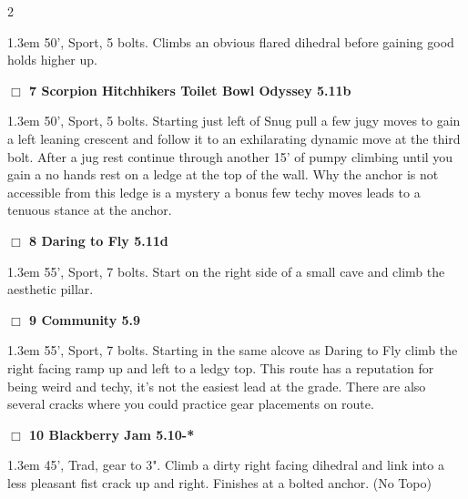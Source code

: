 \begin{multicols}{2}
\begin{adjustwidth}{1.3em}{}
50', Sport, 5 bolts. Climbs an obvious flared dihedral before gaining good holds higher up.
\end{adjustwidth}
\needspace{2em}
\label{rt:Scorpion Hitchhikers Toilet Bowl Odyssey}
\colorbox{RoyalBlue!20}{
\parbox{0.95\linewidth}{
\hspace{-1ex}\textbf{$\Box$
7 Scorpion Hitchhikers Toilet Bowl Odyssey 5.11b  
}}}
\begin{adjustwidth}{1.3em}{}			
50', Sport, 5 bolts. Starting just left of Snug pull a few jugy moves to gain a left leaning crescent and follow it to an exhilarating dynamic move at the third bolt. After a jug rest continue through another 15' of pumpy climbing until you gain a no hands rest on a ledge at the top of the wall. Why the anchor is not accessible from this ledge is a mystery a bonus few techy moves leads to a tenuous stance at the anchor.
\end{adjustwidth}
\needspace{2em}
\label{rt:Daring to Fly}
\colorbox{RoyalBlue!20}{
\parbox{0.95\linewidth}{
\hspace{-1ex}\textbf{$\Box$
8 Daring to Fly 5.11d  
}}}
\begin{adjustwidth}{1.3em}{}			
55', Sport, 7 bolts. Start on the right side of a small cave and climb the aesthetic pillar.
\end{adjustwidth}
\needspace{2em}
\label{rt:Community}
\colorbox{green!20}{
\parbox{0.95\linewidth}{
\hspace{-1ex}\textbf{$\Box$
9 Community 5.9  
}}}
\begin{adjustwidth}{1.3em}{}			
55', Sport, 7 bolts. Starting in the same alcove as Daring to Fly climb the right facing ramp up and left to a ledgy top. This route has a reputation for being weird and techy, it's not the easiest lead at the grade. There are also several cracks where you could practice gear placements on route.
\end{adjustwidth}
\needspace{2em}
\label{rt:Blackberry Jam}
\colorbox{RoyalBlue!20}{
\parbox{0.95\linewidth}{
\hspace{-1ex}\textbf{$\Box$
10 Blackberry Jam 5.10-*  
}}}
\begin{adjustwidth}{1.3em}{}			
45', Trad, gear to 3". Climb a dirty right facing dihedral and link into a less pleasant fist crack up and right. Finishes at a bolted anchor.
  (No Topo)
\end{adjustwidth}
\needspace{2em}
\label{rt:Anaphylactic Shock}

\end{multicols}
